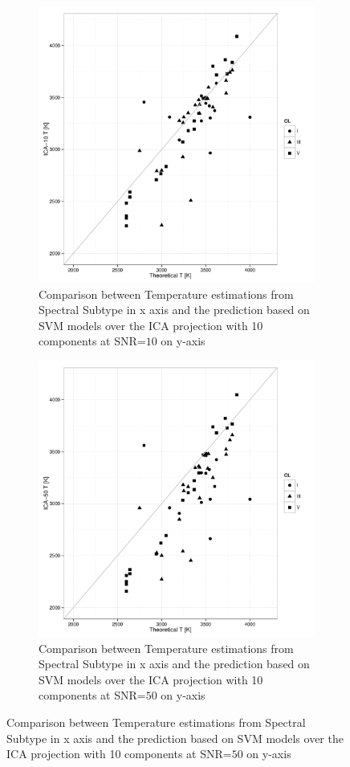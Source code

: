 \begin {figure}
 \centering
 \begin{subfigure}{.85\textwidth}
  \centering
  \includegraphics[width=12cm]{figs/T_ICA_10_SpT.pdf}
  \caption{Comparison between Temperature estimations from Spectral Subtype 
 in x axis and the prediction based on SVM models over the ICA projection 
 with 10 components at SNR=$10$ on y-axis}
 \label{fig:T_ICA_10_SpT}
 \end{subfigure}
  \begin{subfigure}{.85\textwidth}
   \centering
  \includegraphics[width=12cm]{figs/T_ICA_50_SpT.pdf}
  \caption{Comparison between Temperature estimations from Spectral Subtype 
 in x axis and the prediction based on SVM models over the ICA projection 
 with 10 components at SNR=$50$ on y-axis}
 \label{fig:T_ICA_10_SpT}  
  \end{subfigure}
 \label{fig:t_ica_1050_SpT}
\end {figure}

